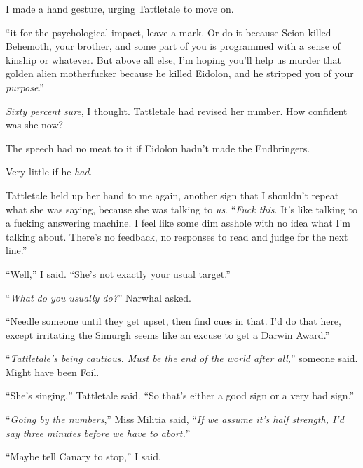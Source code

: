 I made a hand gesture, urging Tattletale to move on.



``\ldotsDo it for the psychological impact, leave a mark.  Or do it because Scion killed Behemoth, your brother, and some part of you is programmed with a sense of kinship or whatever.  But above all else, I'm hoping you'll help us murder that golden alien motherfucker because he killed Eidolon, and he stripped you of your \emph{purpose}.''



\emph{Sixty percent sure}, I thought.  Tattletale had revised her number.  How confident was she now?



The speech had no meat to it if Eidolon hadn't made the Endbringers.



Very little if he \emph{had}.



Tattletale held up her hand to me again, another sign that I shouldn't repeat what she was saying, because she was talking to \emph{us}.  ``\emph{Fuck this}.  It's like talking to a fucking answering machine.  I feel like some dim asshole with no idea what I'm talking about.  There's no feedback, no responses to read and judge for the next line.''



``Well,'' I said.  ``She's not exactly your usual target.''



``\emph{What do you usually do?}''  Narwhal asked.



``Needle someone until they get upset, then find cues in that.  I'd do that here, except irritating the Simurgh seems like an excuse to get a Darwin Award.''



``\emph{Tattletale's being cautious.  Must be the end of the world after all,}'' someone said.  Might have been Foil.



``She's singing,'' Tattletale said.  ``So that's either a good sign or a very bad sign.''



``\emph{Going by the numbers},'' Miss Militia said, ``\emph{If we assume it's half strength, I'd say three minutes before we have to abort.}''



``Maybe tell Canary to stop,'' I said.



